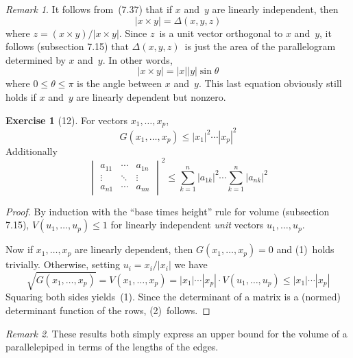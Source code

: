 \documentclass[letterpaper,12pt]{article}
\newcommand{\mult}{\cdot}
\newcommand{\cross}{\times}
\newcommand{\norm}[1]{|#1|}
\newcommand{\abs}[1]{|#1|}
\theoremstyle{definition}
\newtheorem*{exer}{Exercise}
\theoremstyle{remark}
\newtheorem*{rmk}{Remark}
\begin{document}
\begin{rmk}
It follows from~(7.37) that if \(x\) and~\(y\) are linearly independent, then
\[\norm{x\cross y}=\Delta(x,y,z)\]
where \(z=(x\cross y)/\norm{x\cross y}\). Since \(z\)~is a unit vector orthogonal to \(x\) and~\(y\), it follows (subsection 7.15) that \(\Delta(x,y,z)\)~is just the area of the parallelogram determined by \(x\) and~\(y\). In other words,
\[\norm{x\cross y}=\norm{x}\norm{y}\sin\theta\]
where \(0\le\theta\le\pi\) is the angle between \(x\) and~\(y\). This last equation obviously still holds if \(x\) and~\(y\) are linearly dependent but nonzero.
\end{rmk}

\begin{exer}[12]
For vectors \(x_1,\ldots,x_p\),
\[G(x_1,\ldots,x_p)\le\norm{x_1}^2\cdots\norm{x_p}^2\tag{1}\]
Additionally
\[\begin{vmatrix}
a_{11}&\cdots&a_{1n}\\
\vdots&\ddots&\vdots\\
a_{n1}&\cdots&a_{nn}
\end{vmatrix}^2\le\sum_{k=1}^n\abs{a_{1k}}^2\cdots\sum_{k=1}^n\abs{a_{nk}}^2\tag{2}\]
\end{exer}
\begin{proof}
By induction with the ``base times height'' rule for volume (subsection 7.15), \(V(u_1,\ldots,u_p)\le 1\) for linearly independent \emph{unit} vectors \(u_1,\ldots,u_p\).

Now if \(x_1,\ldots,x_p\) are linearly dependent, then \(G(x_1,\ldots,x_p)=0\) and (1)~holds trivially. Otherwise, setting \(u_i=x_i/\norm{x_i}\) we have
\[\sqrt{G(x_1,\ldots,x_p)}=V(x_1,\ldots,x_p)=\norm{x_1}\cdots\norm{x_p}\mult V(u_1,\ldots,u_p)\le\norm{x_1}\cdots\norm{x_p}\]
Squaring both sides yields~(1). Since the determinant of a matrix is a (normed) determinant function of the rows, (2)~follows.
\end{proof}
\begin{rmk}
These results both simply express an upper bound for the volume of a parallelepiped in terms of the lengths of the edges.
\end{rmk}
\end{document}
